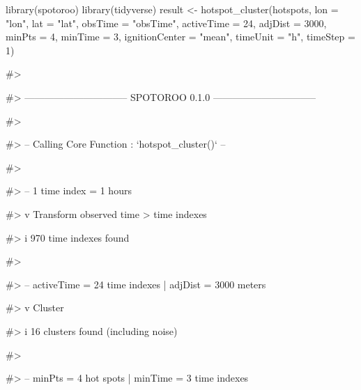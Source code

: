 \begin{Schunk}
\begin{Sinput}
library(spotoroo)
library(tidyverse)
result <- hotspot_cluster(hotspots,
                          lon = "lon",
                          lat = "lat",
                          obsTime = "obsTime",
                          activeTime = 24,
                          adjDist = 3000,
                          minPts = 4,
                          minTime = 3,
                          ignitionCenter = "mean",
                          timeUnit = "h",
                          timeStep = 1)
\end{Sinput}
\begin{Soutput}
#> 
\end{Soutput}
\begin{Soutput}
#> -------------------------------- SPOTOROO 0.1.0 --------------------------------
\end{Soutput}
\begin{Soutput}
#> 
\end{Soutput}
\begin{Soutput}
#> -- Calling Core Function : `hotspot_cluster()` --
\end{Soutput}
\begin{Soutput}
#> 
\end{Soutput}
\begin{Soutput}
#> -- 1 time index = 1 hours
\end{Soutput}
\begin{Soutput}
#> v Transform observed time > time indexes
\end{Soutput}
\begin{Soutput}
#> i 970 time indexes found
\end{Soutput}
\begin{Soutput}
#> 
\end{Soutput}
\begin{Soutput}
#> -- activeTime = 24 time indexes | adjDist = 3000 meters
\end{Soutput}
\begin{Soutput}
#> v Cluster
\end{Soutput}
\begin{Soutput}
#> i 16 clusters found (including noise)
\end{Soutput}
\begin{Soutput}
#> 
\end{Soutput}
\begin{Soutput}
#> -- minPts = 4 hot spots | minTime = 3 time indexes
\end{Soutput}

\end{Schunk}
